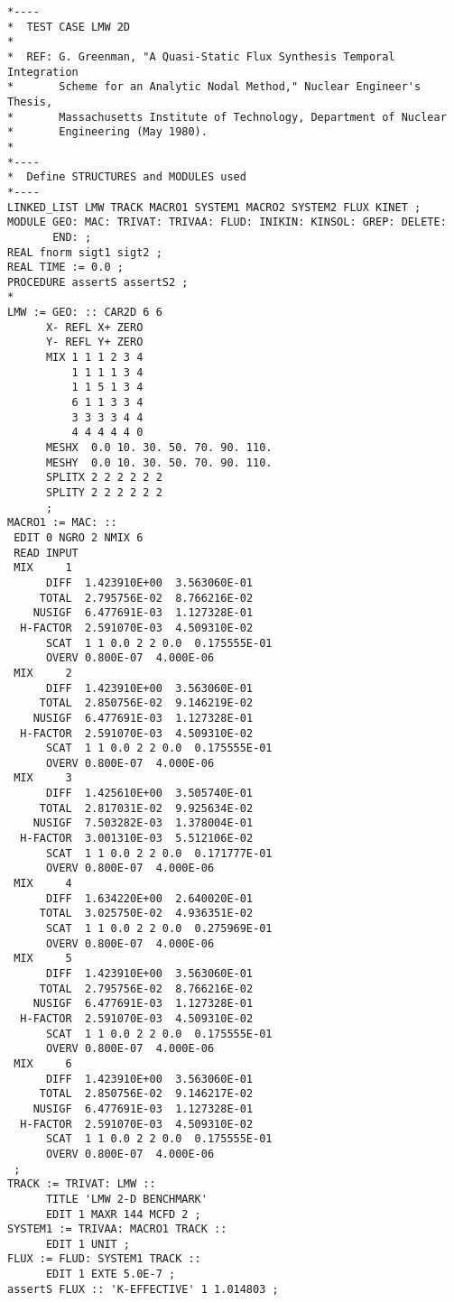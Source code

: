\goodbreak
\begin{verbatim}
*----
*  TEST CASE LMW 2D
*
*  REF: G. Greenman, "A Quasi-Static Flux Synthesis Temporal Integration
*       Scheme for an Analytic Nodal Method," Nuclear Engineer's Thesis,
*       Massachusetts Institute of Technology, Department of Nuclear
*       Engineering (May 1980).
*
*----
*  Define STRUCTURES and MODULES used
*----
LINKED_LIST LMW TRACK MACRO1 SYSTEM1 MACRO2 SYSTEM2 FLUX KINET ;
MODULE GEO: MAC: TRIVAT: TRIVAA: FLUD: INIKIN: KINSOL: GREP: DELETE:
       END: ;
REAL fnorm sigt1 sigt2 ;
REAL TIME := 0.0 ;
PROCEDURE assertS assertS2 ;
*
LMW := GEO: :: CAR2D 6 6
      X- REFL X+ ZERO
      Y- REFL Y+ ZERO
      MIX 1 1 1 2 3 4
          1 1 1 1 3 4
          1 1 5 1 3 4
          6 1 1 3 3 4
          3 3 3 3 4 4
          4 4 4 4 4 0
      MESHX  0.0 10. 30. 50. 70. 90. 110.
      MESHY  0.0 10. 30. 50. 70. 90. 110.
      SPLITX 2 2 2 2 2 2
      SPLITY 2 2 2 2 2 2
      ;
MACRO1 := MAC: ::
 EDIT 0 NGRO 2 NMIX 6
 READ INPUT
 MIX     1
      DIFF  1.423910E+00  3.563060E-01
     TOTAL  2.795756E-02  8.766216E-02
    NUSIGF  6.477691E-03  1.127328E-01
  H-FACTOR  2.591070E-03  4.509310E-02
      SCAT  1 1 0.0 2 2 0.0  0.175555E-01
      OVERV 0.800E-07  4.000E-06
 MIX     2
      DIFF  1.423910E+00  3.563060E-01
     TOTAL  2.850756E-02  9.146219E-02
    NUSIGF  6.477691E-03  1.127328E-01
  H-FACTOR  2.591070E-03  4.509310E-02
      SCAT  1 1 0.0 2 2 0.0  0.175555E-01
      OVERV 0.800E-07  4.000E-06
 MIX     3
      DIFF  1.425610E+00  3.505740E-01
     TOTAL  2.817031E-02  9.925634E-02
    NUSIGF  7.503282E-03  1.378004E-01
  H-FACTOR  3.001310E-03  5.512106E-02
      SCAT  1 1 0.0 2 2 0.0  0.171777E-01
      OVERV 0.800E-07  4.000E-06
 MIX     4
      DIFF  1.634220E+00  2.640020E-01
     TOTAL  3.025750E-02  4.936351E-02
      SCAT  1 1 0.0 2 2 0.0  0.275969E-01
      OVERV 0.800E-07  4.000E-06
 MIX     5
      DIFF  1.423910E+00  3.563060E-01
     TOTAL  2.795756E-02  8.766216E-02
    NUSIGF  6.477691E-03  1.127328E-01
  H-FACTOR  2.591070E-03  4.509310E-02
      SCAT  1 1 0.0 2 2 0.0  0.175555E-01
      OVERV 0.800E-07  4.000E-06
 MIX     6
      DIFF  1.423910E+00  3.563060E-01
     TOTAL  2.850756E-02  9.146217E-02
    NUSIGF  6.477691E-03  1.127328E-01
  H-FACTOR  2.591070E-03  4.509310E-02
      SCAT  1 1 0.0 2 2 0.0  0.175555E-01
      OVERV 0.800E-07  4.000E-06
 ;
TRACK := TRIVAT: LMW ::
      TITLE 'LMW 2-D BENCHMARK'
      EDIT 1 MAXR 144 MCFD 2 ;
SYSTEM1 := TRIVAA: MACRO1 TRACK ::
      EDIT 1 UNIT ;
FLUX := FLUD: SYSTEM1 TRACK ::
      EDIT 1 EXTE 5.0E-7 ;
assertS FLUX :: 'K-EFFECTIVE' 1 1.014803 ;

\end{verbatim}
